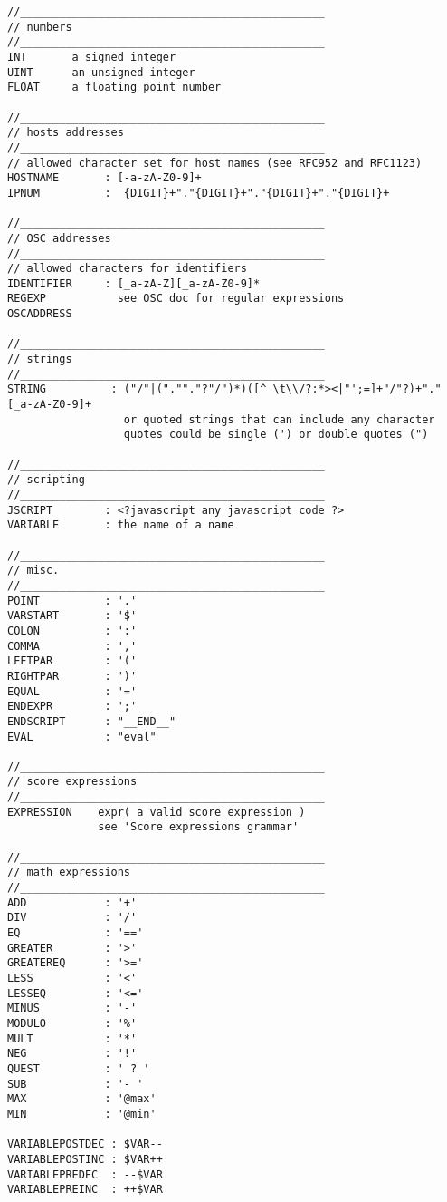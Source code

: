 
\label{lex}

\begin{verbatim}
//_______________________________________________
// numbers
//_______________________________________________
INT       a signed integer
UINT      an unsigned integer
FLOAT     a floating point number

//_______________________________________________
// hosts addresses
//_______________________________________________
// allowed character set for host names (see RFC952 and RFC1123)
HOSTNAME       : [-a-zA-Z0-9]+ 
IPNUM          :  {DIGIT}+"."{DIGIT}+"."{DIGIT}+"."{DIGIT}+

//_______________________________________________
// OSC addresses
//_______________________________________________
// allowed characters for identifiers
IDENTIFIER     : [_a-zA-Z][_a-zA-Z0-9]*
REGEXP           see OSC doc for regular expressions
OSCADDRESS

//_______________________________________________
// strings
//_______________________________________________
STRING          : ("/"|(".""."?"/")*)([^ \t\\/?:*><|"';=]+"/"?)+"."[_a-zA-Z0-9]+
                  or quoted strings that can include any character
                  quotes could be single (') or double quotes (")

//_______________________________________________
// scripting
//_______________________________________________
JSCRIPT        : <?javascript any javascript code ?>
VARIABLE       : the name of a name

//_______________________________________________
// misc.
//_______________________________________________
POINT          : '.'
VARSTART       : '$'
COLON          : ':'
COMMA          : ','
LEFTPAR        : '('
RIGHTPAR       : ')'
EQUAL          : '='
ENDEXPR        : ';'
ENDSCRIPT      : "__END__"
EVAL           : "eval"

//_______________________________________________
// score expressions
//_______________________________________________
EXPRESSION    expr( a valid score expression )
              see 'Score expressions grammar'

//_______________________________________________
// math expressions
//_______________________________________________
ADD            : '+'
DIV            : '/'
EQ             : '=='
GREATER        : '>'
GREATEREQ      : '>='
LESS           : '<'
LESSEQ         : '<='
MINUS          : '-'
MODULO         : '%'
MULT           : '*'
NEG            : '!'
QUEST          : ' ? '
SUB            : '- '
MAX            : '@max' 
MIN            : '@min'

VARIABLEPOSTDEC : $VAR--
VARIABLEPOSTINC : $VAR++
VARIABLEPREDEC  : --$VAR
VARIABLEPREINC  : ++$VAR

\end{verbatim}

